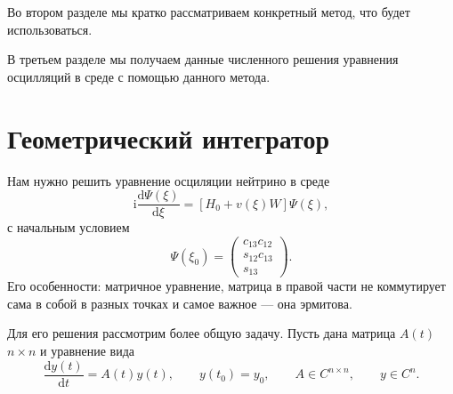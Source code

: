 \documentclass[a4paper,12pt]{article}
\newcommand{\dd}{\mathrm{d}}
\renewcommand{\imath}{\mathrm{i}}
\begin{document}
Во втором разделе мы кратко рассматриваем конкретный метод, что будет использоваться.

В третьем разделе мы получаем данные численного решения уравнения осцилляций в среде с помощью данного метода.

	\newpage
\section{Геометрический интегратор}

		Нам нужно решить уравнение осциляции нейтрино в среде
	\begin{equation}\label{eq:15}
		\imath\frac{\dd\Psi(\xi)}{\dd\xi}=[H_{0}+ v(\xi)W]\Psi(\xi),
	\end{equation}
	с начальным условием
	\begin{equation}\label{eq:19}
		\Psi(\xi_0)=
		\begin{pmatrix}
			c_{13}c_{12}\\
			s_{12}c_{13}\\
			s_{13}
		\end{pmatrix}.
	\end{equation}
	Его особенности: матричное уравнение, матрица в правой части не коммутирует сама в собой в разных точках и самое важное — она эрмитова.

Для его решения рассмотрим более общую задачу. Пусть дана матрица \(A(t)\) \(n\times n\) и уравнение вида
	\begin{equation}\label{eq:41}
		\frac{\dd y(t)}{\dd t}=A(t)y(t),\qquad y(t_0)=y_0,\qquad A\in C^{n \times n},\qquad y\in C^{n}.
	\end{equation}
\end{document}
